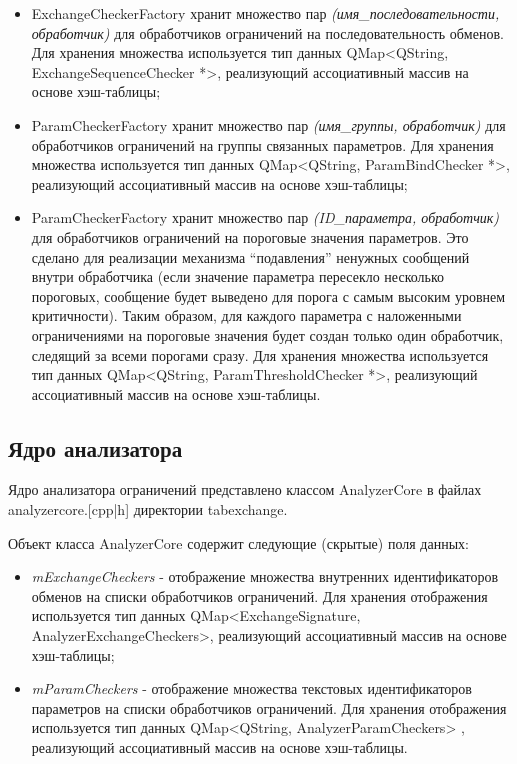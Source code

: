 \begin{itemize}
 \item ExchangeCheckerFactory хранит множество пар 
\textit{(имя\_последовательности, обработчик)} для обработчиков ограничений на 
последовательность обменов. Для хранения множества используется тип данных 
QMap<QString, ExchangeSequenceChecker *>, реализующий ассоциативный массив на 
основе хэш-таблицы;
 \item ParamCheckerFactory хранит множество пар \textit{(имя\_группы, 
обработчик)} для обработчиков ограничений на группы связанных параметров. Для 
хранения множества используется тип данных QMap<QString, ParamBindChecker *>, 
реализующий ассоциативный массив на основе хэш-таблицы;
 \item ParamCheckerFactory хранит множество пар \textit{(ID\_параметра, 
обработчик)} для обработчиков ограничений на пороговые значения параметров. Это 
сделано для реализации механизма ``подавления'' ненужных сообщений внутри 
обработчика (если значение параметра пересекло несколько пороговых, сообщение 
будет выведено для порога с самым высоким уровнем критичности). Таким образом, 
для каждого параметра с наложенными ограничениями на пороговые значения будет 
создан только один обработчик, следящий за всеми порогами сразу. Для хранения 
множества используется тип данных QMap<QString, ParamThresholdChecker *>, 
реализующий ассоциативный массив на основе хэш-таблицы.
\end{itemize}

\subsection*{Ядро анализатора}

Ядро анализатора ограничений представлено классом AnalyzerCore в файлах 
analyzercore.[cpp|h] директории tabexchange.

Объект класса AnalyzerCore содержит следующие (скрытые) поля данных:

\begin{itemize}
 \item \textit{mExchangeCheckers} - отображение множества внутренних 
идентификаторов обменов на списки обработчиков ограничений. Для хранения 
отображения используется тип данных QMap<ExchangeSignature, 
AnalyzerExchangeCheckers>, реализующий ассоциативный массив на основе 
хэш-таблицы;
 \item \textit{mParamCheckers} - отображение множества текстовых 
идентификаторов параметров на списки обработчиков ограничений. Для хранения 
отображения используется тип данных QMap<QString, AnalyzerParamCheckers> , 
реализующий ассоциативный массив на основе хэш-таблицы.
\end{itemize}

